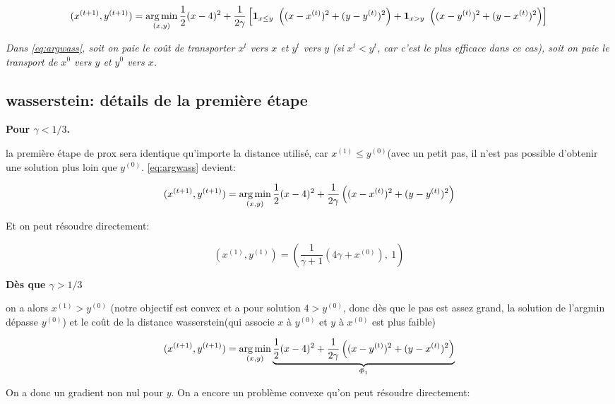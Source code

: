 \begin{equation} \label{eq:argwass}
	(x^{(t+1)}, y^{(t+1)}) = \operatorname*{arg\,min}_{(x, y)} \frac{1}{2}(x-4)^2 + \frac{1}{2 \gamma} \left[ \mathbf{1}_{x \leq y} ~ \left((x-x^{(t)})^2 + (y - y^{(t)})^2\right) + \mathbf{1}_{x > y} ~ \left((x-y^{(t)})^2 + (y - x^{(t)})^2\right) \right]
\end{equation}

\emph{Dans \cref{eq:argwass}, soit on paie le coût de transporter $x^t$ vers $x$ et $y^t$ vers $y$ (si $x^t < y^t$, car c'est le plus efficace dans ce cas), soit on paie le transport de $x^0$ vers $y$ et $y^0$ vers $x$.}

\subsection{wasserstein: détails de la première étape}

\textbf{Pour $\gamma < 1/3$.}

la première étape de prox sera identique qu'importe la distance utilisé, car $x^{(1)} \leq y^{(0)}$(avec un petit pas, il n'est pas possible d'obtenir une solution plus loin que $y^{(0)}$. \cref{eq:argwass} devient:

\begin{equation}
	(x^{(t+1)}, y^{(t+1)}) = \operatorname*{arg\,min}_{(x, y)} \frac{1}{2}(x-4)^2 + \frac{1}{2 \gamma} \left((x-x^{(t)})^2 + (y - y^{(t)})^2\right)
\end{equation}

Et on peut résoudre directement:

\begin{equation}
	(x^{(1)}, y^{(1)}) = (\frac{1}{\gamma + 1} \left( 4 \gamma + x^{(0)} \right), \ 1)
\end{equation}

\textbf{Dès que $\gamma > 1/3$}

on a alors $x^{(1)} > y^{(0)}$ (notre objectif est convex et a pour solution $4 > y^{(0)}$, donc dès que le pas est assez grand, la solution de l'argmin dépasse $y^{(0)}$) et le coût de la distance wasserstein(qui associe $x$ à $y^{(0)}$ et $y$ à $x^{(0)}$ est plus faible)

\begin{equation}
	(x^{(t+1)}, y^{(t+1)}) = \operatorname*{arg\,min}_{(x, y)} \underbrace{\frac{1}{2}(x-4)^2 + \frac{1}{2 \gamma} \left((x-y^{(t)})^2 + (y - x^{(t)})^2\right)}_{\varPhi_1}
\end{equation}

On a donc un gradient non nul pour $y$. On a encore un problème convexe qu'on peut résoudre directement:

